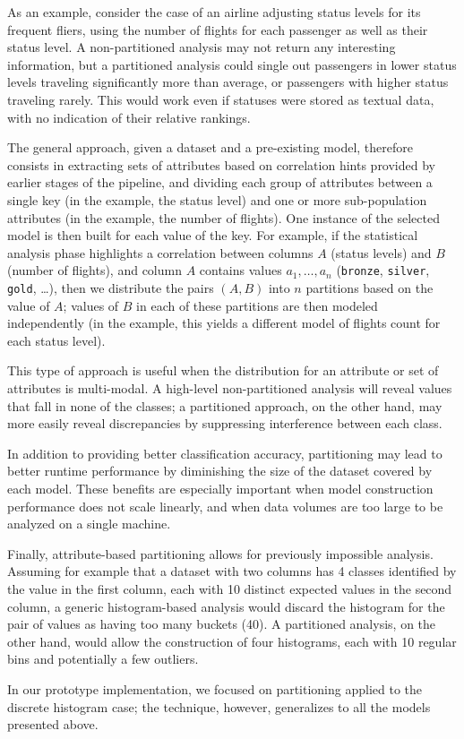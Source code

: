 As an example, consider the case of an airline adjusting status levels for its frequent fliers, using the number of flights for each passenger as well as their status level. A non-partitioned analysis may not return any interesting information, but a partitioned analysis could single out passengers in lower status levels traveling significantly more than average, or passengers with higher status traveling rarely. This would work even if statuses were stored as textual data, with no indication of their relative rankings.

The general approach, given a dataset and a pre-existing model, therefore consists in extracting sets of attributes based on correlation hints provided by earlier stages of the pipeline, and dividing each group of attributes between a single key (in the example, the status level) and one or more sub-population attributes (in the example, the number of flights). One instance of the selected model is then built for each value of the key. For example, if the statistical analysis phase highlights a correlation between columns $A$ (status levels) and $B$ (number of flights), and column $A$ contains values $a_1, \dots, a_n$ (\texttt{bronze}, \texttt{silver}, \texttt{gold}, \dots), then we distribute the pairs $(A, B)$ into $n$ partitions based on the value of $A$; values of $B$ in each of these partitions are then modeled independently (in the example, this yields a different model of flights count for each status level).

This type of approach is useful when the distribution for an attribute or set of attributes is multi-modal. A high-level non-partitioned analysis will reveal values that fall in none of the classes; a partitioned approach, on the other hand, may more easily reveal discrepancies by suppressing interference between each class.

In addition to providing better classification accuracy, partitioning may lead to better runtime performance by diminishing the size of the dataset covered by each model. These benefits are especially important when model construction performance does not scale linearly, and when data volumes are too large to be analyzed on a single machine.

Finally, attribute-based partitioning allows for previously impossible analysis. Assuming for example that a dataset with two columns has 4 classes identified by the value in the first column, each with 10 distinct expected values in the second column, a generic histogram-based analysis would discard the histogram for the pair of values as having too many buckets (40). A partitioned analysis, on the other hand, would allow the construction of four histograms, each with 10 regular bins and potentially a few outliers.

In our prototype implementation, we focused on partitioning applied to the discrete histogram case; the technique, however, generalizes to all the models presented above.
